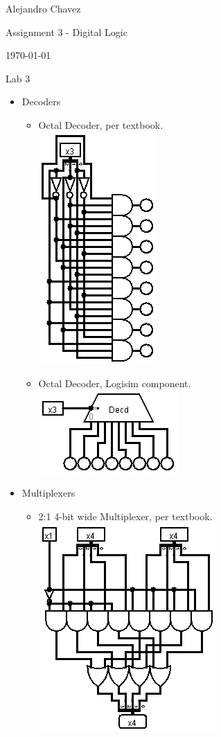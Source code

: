 \documentclass{article}
\begin{document}
\hfill Alejandro Chavez

\hfill Assignment 3 - Digital Logic

\hfill \today\\

\begin{center}\begin{large}Lab 3\end{large}\end{center}\begin{itemize}
	\item
		Decoders
	\begin{itemize}
		\item
			Octal Decoder, per textbook.\\
      \includegraphics[scale=0.5]{lab3decoder1.png}
		\item
			Octal Decoder, Logisim component.\\
      \includegraphics[scale=0.5]{lab3decoder2.png}
	\end{itemize}
	\item
		Multiplexers
	\begin{itemize}
		\item
			2:1 4-bit wide Multiplexer, per textbook.\\
      \includegraphics[scale=0.5]{lab3multiplexer1.png}

\end{itemize}
\end{itemize}
\end{document}
